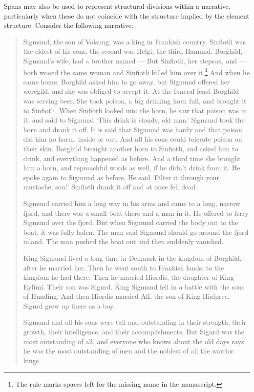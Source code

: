 Spans may also be used to represent structural divisions within a narrative, particularly when these do not coincide with the structure implied by the element structure. Consider the following narrative: 
\begin{quote}\par
Sigmund, the son of Volsung, was a king in Frankish country. Sinfiotli was the eldest of his sons, the second was Helgi, the third Hamund. Borghild, Sigmund's wife, had a brother named — But Sinfiotli, her stepson, and — both wooed the same woman and Sinfiotli killed him over it.\footnote{The rule marks spaces left for the missing name in the manuscript.} And when he came home, Borghild asked him to go away, but Sigmund offered her weregild, and she was obliged to accept it. At the funeral feast Borghild was serving beer. She took poison, a big drinking horn full, and brought it to Sinfiotli. When Sinfiotli looked into the horn, he saw that poison was in it, and said to Sigmund ‘This drink is cloudy, old man.’ Sigmund took the horn and drank it off. It is said that Sigmund was hardy and that poison did him no harm, inside or out. And all his sons could tolerate poison on their skin. Borghild brought another horn to Sinfiotli, and asked him to drink, and everything happened as before. And a third time she brought him a horn, and reproachful words as well, if he didn't drink from it. He spoke again to Sigmund as before. He said ‘Filter it through your mustache, son!’ Sinfiotli drank it off and at once fell dead. \par
Sigmund carried him a long way in his arms and came to a long, narrow fjord, and there was a small boat there and a man in it. He offered to ferry Sigmund over the fjord. But when Sigmund carried the body out to the boat, it was fully laden. The man said Sigmund should go around the fjord inland. The man pushed the boat out and then suddenly vanished.  \par
King Sigmund lived a long time in Denmark in the kingdom of Borghild, after he married her. Then he went south to Frankish lands, to the kingdom he had there. Then he married Hiordis, the daughter of King Eylimi. Their son was Sigurd. King Sigmund fell in a battle with the sons of Hunding. And then Hiordis married Alf, the son of King Hialprec. Sigurd grew up there as a boy.  \par
Sigmund and all his sons were tall and outstanding in their strength, their growth, their intelligence, and their accomplishments. But Sigurd was the most outstanding of all, and everyone who knows about the old days says he was the most outstanding of men and the noblest of all the warrior kings.\end{quote}
